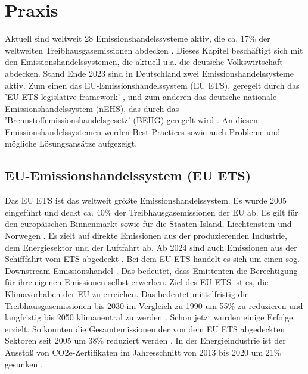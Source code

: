 \chapter{Praxis}

Aktuell sind weltweit 28 Emissionshandelssysteme aktiv, die ca. 17\% der weltweiten Treibhausgasemissionen abdecken \cite[S. 7]{icap.2023}.
Dieses Kapitel beschäftigt sich mit den Emissionshandelssystemen, die aktuell u.a. die deutsche Volkswirtschaft abdecken.
Stand Ende 2023 sind in Deutschland zwei Emissionshandelssysteme aktiv.
Zum einen das EU-Emissionshandelssystem (EU ETS), geregelt durch das 'EU ETS legislative framework' \cite{eu.2023}, und zum anderen das deutsche nationale Emissionshandelssystem (nEHS), das durch das 'Brennstoffemissionshandelsgesetz' (BEHG) geregelt wird \cite{dehst.2023}.
An diesen Emissionshandelssystemen werden Best Practices sowie auch Probleme und mögliche Lösungsansätze aufgezeigt.

\section{EU-Emissionshandelssystem (EU ETS)}

Das EU ETS ist das weltweit größte Emissionshandelssystem. Es wurde 2005 eingeführt und deckt ca. 40\% der Treibhausgasemissionen der EU ab. Es gilt für den europäischen Binnenmarkt sowie für die Staaten Island, Liechtenstein und Norwegen \cite[S. 186]{hubert.2020}.
Es zielt auf direkte Emissionen aus der produzierenden Industrie, dem Energiesektor und der Luftfahrt ab. Ab 2024 sind auch Emissionen aus der Schifffahrt vom ETS abgedeckt \cite{eu.2023}.
Bei dem EU ETS handelt es sich um einen sog. Downstream Emissionshandel \cite{dehst.2023}. 
Das bedeutet, dass Emittenten die Berechtigung für ihre eigenen Emissionen selbst erwerben. Ziel des EU ETS ist es, die Klimavorhaben der EU zu erreichen.
Das bedeutet mittelfristig die Treibhausgasemissionen bis 2030 im Vergleich zu 1990 um 55\% zu reduzieren und langfristig bis 2050 klimaneutral zu werden \cite{eu.2023}. Schon jetzt wurden einige Erfolge erzielt. 
So konnten die Gesamtemissionen der von dem EU ETS abgedeckten Sektoren seit 2005 um 38\% reduziert werden \cite{dehst3.2023}.
In der Energieindustrie ist der Ausstoß von CO2e-Zertifikaten im Jahresschnitt von 2013 bis 2020 um 21\% gesunken \cite{ub3.2023}.

